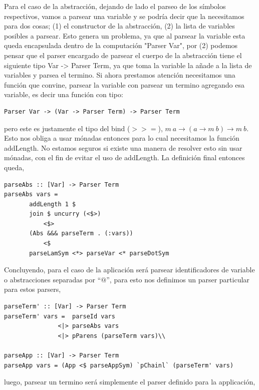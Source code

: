 \documentclass[a4paper,10pt]{article}
\begin{document}
Para el caso de la abstracción, dejando de lado el parseo de los símbolos respectivos,
vamos a parsear una variable y se podría decir que la necesitamos para dos cosas;
(1) el constructor de la abstracción, (2) la lista de variables posibles a parsear.
Esto genera un problema, ya que al parsear la variable esta queda encapsulada 
dentro de la computación "Parser Var", por (2) podemos pensar que el parser encargado
de parsear el cuerpo de la abstracción tiene el siguiente tipo Var -> Parser Term,
ya que toma la variable la añade a la lista de variables y parsea el termino.
Si ahora prestamos atención necesitamos una función que convine, parsear la variable con
parsear un termino agregando esa variable, es decir una función con tipo:

\begin{lstlisting}
Parser Var -> (Var -> Parser Term) -> Parser Term
\end{lstlisting}

pero este es justamente el tipo del bind ($>>=$), $m \ a \rightarrow (a \rightarrow m \ b) \rightarrow m \ b$. Esto
nos obliga a usar mónadas entonces para lo cual necesitamos la función addLength.
No estamos seguros si existe una manera de resolver esto sin usar mónadas, con el
fin de evitar el uso de addLength. La definición final entonces queda,

\begin{lstlisting}
parseAbs :: [Var] -> Parser Term
parseAbs vars = 
       addLength 1 $
       join $ uncurry (<$>) 
           <$> 
       (Abs &&& parseTerm . (:vars))
       	   <$ 
       parseLamSym <*> parseVar <* parseDotSym
\end{lstlisting}

Concluyendo, para el caso de la aplicación será parsear identificadores de variable
o abstracciones separadas por ``$@$'', para esto nos definimos un parser particular
para estos parsers,

\begin{lstlisting}
parseTerm' :: [Var] -> Parser Term
parseTerm' vars =  parseId vars
               <|> parseAbs vars
               <|> pParens (parseTerm vars)\\

parseApp :: [Var] -> Parser Term
parseApp vars = (App <$ parseAppSym) `pChainl` (parseTerm' vars)
\end{lstlisting}

luego, parsear un termino será simplemente el parser definido para la applicación,\\
\end{document}
